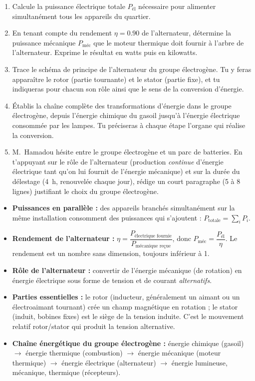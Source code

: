 \documentclass[11pt]{article}
\newcommand{\cle}[1]{{\popxbold\color{popdark}#1}}
\newcounter{popsec}
\newcounter{popsub}
\newcommand{\courssub}[1]{%
  \stepcounter{popsub}%
  \par\vspace{9pt}\noindent{\popxbold\fontsize{11.5}{13}\selectfont\color{popink}{\color{poporange}\thepopsec.\thepopsub}\hspace{6pt}#1}\par\nopagebreak\vspace{4pt}
}
\begin{document}
\begin{enumerate}
\item Calcule la \cle{puissance électrique totale} $P_{\text{él}}$ nécessaire pour alimenter simultanément tous les appareils du quartier.
\item En tenant compte du rendement $\eta = \num{0,90}$ de l'alternateur, détermine la \cle{puissance mécanique} $P_{\text{méc}}$ que le moteur thermique doit fournir à l'arbre de l'alternateur. Exprime le résultat en watts puis en kilowatts.
\item Trace le \cle{schéma de principe} de l'alternateur du groupe électrogène. Tu y feras apparaître le \cle{rotor} (partie tournante) et le \cle{stator} (partie fixe), et tu indiqueras pour chacun son rôle ainsi que le sens de la conversion d'énergie.
\item Établis la \cle{chaîne complète des transformations d'énergie} dans le groupe électrogène, depuis l'énergie chimique du gasoil jusqu'à l'énergie électrique consommée par les lampes. Tu préciseras à chaque étape l'organe qui réalise la conversion.
\item M.~Hamadou hésite entre le groupe électrogène et un parc de batteries. En t'appuyant sur le rôle de l'alternateur (production \emph{continue} d'énergie électrique tant qu'on lui fournit de l'énergie mécanique) et sur la durée du délestage (4~h, renouvelée chaque jour), rédige un court paragraphe (5 à 8 lignes) justifiant le choix du groupe électrogène.
\end{enumerate}

\courssub{Ressources à mobiliser}

\begin{aretenir}
\begin{itemize}
\item \textbf{Puissances en parallèle :} des appareils branchés simultanément sur la même installation consomment des puissances qui s'ajoutent : $P_{\text{totale}} = \sum_i P_i$.
\item \textbf{Rendement de l'alternateur :} $\eta = \dfrac{P_{\text{électrique fournie}}}{P_{\text{mécanique reçue}}}$, donc $P_{\text{méc}} = \dfrac{P_{\text{él}}}{\eta}$. Le rendement est un nombre sans dimension, toujours inférieur à 1.
\item \textbf{Rôle de l'alternateur :} convertir de l'\cle{énergie mécanique} (de rotation) en \cle{énergie électrique} sous forme de tension et de courant \emph{alternatifs}.
\item \textbf{Parties essentielles :} le \cle{rotor} (inducteur, généralement un aimant ou un électroaimant tournant) crée un champ magnétique en rotation ; le \cle{stator} (induit, bobines fixes) est le siège de la tension induite. C'est le mouvement relatif rotor/stator qui produit la tension alternative.
\item \textbf{Chaîne énergétique du groupe électrogène :} énergie chimique (gasoil) $\rightarrow$ énergie thermique (combustion) $\rightarrow$ énergie mécanique (moteur thermique) $\rightarrow$ énergie électrique (alternateur) $\rightarrow$ énergie lumineuse, mécanique, thermique (récepteurs).
\end{itemize}
\end{aretenir}
\end{document}
